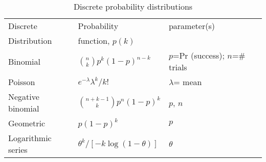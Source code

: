 \begin{table}[htbp]%
\caption{Discrete probability distributions\label{tab:distns}}%
\small
\centering
\begin{tabular}{lll}\hline
Discrete     & Probability  & parameter(s)  \\ 
Distribution & function, $p(k)$  
\\ \hline
%
Binomial & $\binom nk p^k(1-p)^{n-k}$ & \brk{$p$=Pr (success);\\ $n$=\# trials} \\[1ex] 
Poisson & $e^{-\lambda }\lambda ^k/k!$ & $\lambda$= mean  \\[1ex] 
Negative binomial & $\binom{n+k-1}kp^n(1-p)^k$ &  $p$, $n$  \\[1ex] 
Geometric & $p(1-p)^k$ &  $p$  \\[1ex]
Logarithmic series & $\theta ^k/[-k\log (1-\theta )]$ &  $\theta$ \\[1ex] \hline
\end{tabular}
\end{table}%

